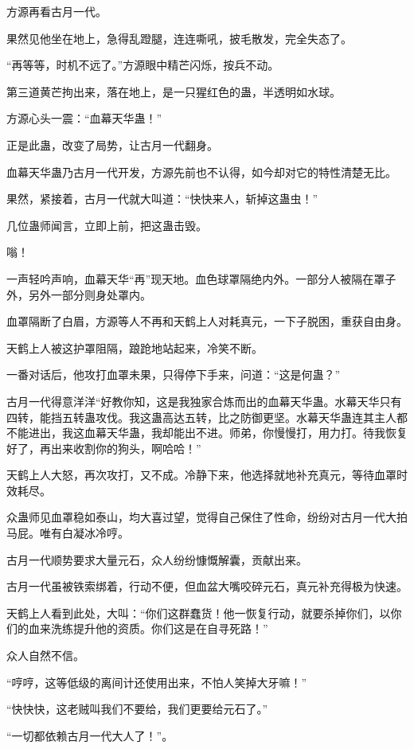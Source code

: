 \begin{this_body}
方源再看古月一代。

果然见他坐在地上，急得乱蹬腿，连连嘶吼，披毛散发，完全失态了。

“再等等，时机不远了。”方源眼中精芒闪烁，按兵不动。

第三道黄芒拘出来，落在地上，是一只猩红色的蛊，半透明如水球。

方源心头一震：“血幕天华蛊！”

正是此蛊，改变了局势，让古月一代翻身。

血幕天华蛊乃古月一代开发，方源先前也不认得，如今却对它的特性清楚无比。

果然，紧接着，古月一代就大叫道：“快快来人，斩掉这蛊虫！”

几位蛊师闻言，立即上前，把这蛊击毁。

嗡！

一声轻吟声响，血幕天华“再”现天地。血色球罩隔绝内外。一部分人被隔在罩子外，另外一部分则身处罩内。

血罩隔断了白眉，方源等人不再和天鹤上人对耗真元，一下子脱困，重获自由身。

天鹤上人被这护罩阻隔，踉跄地站起来，冷笑不断。

一番对话后，他攻打血罩未果，只得停下手来，问道：“这是何蛊？”

古月一代得意洋洋“好教你知，这是我独家合炼而出的血幕天华蛊。水幕天华只有四转，能挡五转蛊攻伐。我这蛊高达五转，比之防御更坚。水幕天华蛊连其主人都不能进出，我这血幕天华蛊，我却能出不进。师弟，你慢慢打，用力打。待我恢复好了，再出来收割你的狗头，啊哈哈！”

天鹤上人大怒，再次攻打，又不成。冷静下来，他选择就地补充真元，等待血罩时效耗尽。

众蛊师见血罩稳如泰山，均大喜过望，觉得自己保住了性命，纷纷对古月一代大拍马屁。唯有白凝冰冷哼。

古月一代顺势要求大量元石，众人纷纷慷慨解囊，贡献出来。

古月一代虽被铁索绑着，行动不便，但血盆大嘴咬碎元石，真元补充得极为快速。

天鹤上人看到此处，大叫：“你们这群蠢货！他一恢复行动，就要杀掉你们，以你们的血来洗练提升他的资质。你们这是在自寻死路！”

众人自然不信。

“哼哼，这等低级的离间计还使用出来，不怕人笑掉大牙嘛！”

“快快快，这老贼叫我们不要给，我们更要给元石了。”

“一切都依赖古月一代大人了！”。

\end{this_body}


